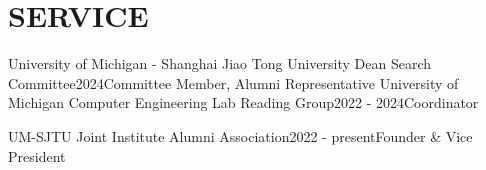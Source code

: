 \section{SERVICE}
    \resumeSubHeadingListStart
        \resumeSubheading
        {University of Michigan - Shanghai Jiao Tong University Dean Search Committee}{2024}{Committee Member, Alumni Representative}{}
        \resumeSubheading
        {University of Michigan Computer Engineering Lab Reading Group}{2022 - 2024}{Coordinator}{}

        \resumeSubheading
        {UM-SJTU Joint Institute Alumni Association}{2022 - present}{Founder \& Vice President}{}
            
    \resumeSubHeadingListEnd
